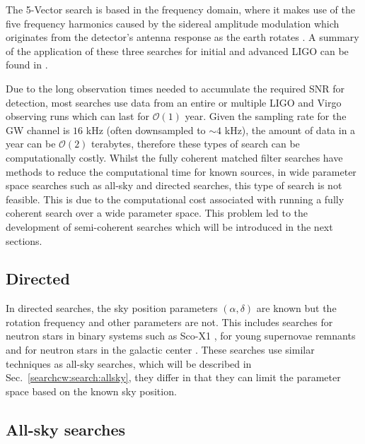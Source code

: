 The 5-Vector search is based in the frequency domain, where it makes
use of the five frequency harmonics caused by the sidereal amplitude
modulation which originates from the detector's antenna response as
the earth rotates \citep{astone2010MethodDetection,aasi2014GRAVITATIONALWAVES}.
A summary of the application of these three searches for initial and advanced
\gls{LIGO} can be found in
\citep{aasi2014GRAVITATIONALWAVES,abbott2019SearchesGravitationala}.

Due to the long observation times needed to accumulate the required \gls{SNR}
for detection, most searches use data from an entire or multiple \gls{LIGO} and Virgo observing runs
which can last for $\mathcal{O}(1)$ year.  Given the sampling rate for the \gls{GW} channel is $16$ kHz (often downsampled
to $\sim 4$ kHz), the amount of data in a year can be $\mathcal{O}(2)$
terabytes, therefore these types of search can be computationally costly.
Whilst the fully coherent matched filter searches have methods to reduce the
computational time for known sources, in wide parameter space searches such as all-sky and directed searches, this
type of search is not feasible. 
This is due to the computational cost associated with running a fully coherent search over a wide parameter space.
This problem led to the development of semi-coherent searches which will be introduced in the
next sections. 

\subsection{\label{searchcw:search:directed}Directed}

In directed searches, the sky position parameters
$(\alpha,\delta)$ are known but the rotation frequency and other parameters are not. 
This includes searches for neutron stars in binary systems such as Sco-X1
\citep{abbott2017UpperLimits,meadors2016TuningScorpius}, for young supernovae remnants \citep{abadie2010FIRSTSEARCH} and for neutron stars in the galactic center \citep{piccinni2019DirectedSearch}. These searches use similar techniques as all-sky searches, which will be described in
Sec.~\ref{searchcw:search:allsky}, they differ in that they can limit the
parameter space based on the known sky position.

\subsection{\label{searchcw:search:allsky}All-sky searches}

